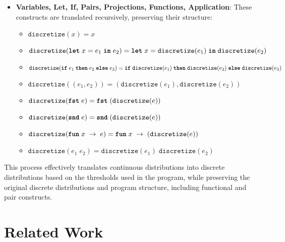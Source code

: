 \documentclass[nonacm,anonymous]{acmart}
\newcommand{\letkw}{\text{\ttfamily\bfseries let}}
\newcommand{\inkw}{\text{\ttfamily\bfseries in}}
\newcommand{\ifkw}{\text{\ttfamily\bfseries if}}
\newcommand{\thenkw}{\text{\ttfamily\bfseries then}}
\newcommand{\elsekw}{\text{\ttfamily\bfseries else}}
\newcommand{\fstkw}{\text{\ttfamily\bfseries fst}}
\newcommand{\sndkw}{\text{\ttfamily\bfseries snd}}
\newcommand{\funkw}{\text{\ttfamily\bfseries fun}}
\begin{document}
\begin{itemize}
    \item \textbf{Variables, Let, If, Pairs, Projections, Functions, Application}: These constructs are translated recursively, preserving their structure:
    \begin{itemize}
        \item $\texttt{discretize}(x) = x$
        \item $\texttt{discretize}(\letkw \; x = e_1 \; \inkw \; e_2) = \letkw \; x = \texttt{discretize}(e_1) \; \inkw \; \texttt{discretize}(e_2)$
        \item $\texttt{discretize}(\ifkw \; e_1 \; \thenkw \; e_2 \; \elsekw \; e_3) = \ifkw \; \texttt{discretize}(e_1) \; \thenkw \; \texttt{discretize}(e_2) \; \elsekw \; \texttt{discretize}(e_3)$
        \item $\texttt{discretize}((e_1, e_2)) = (\texttt{discretize}(e_1), \texttt{discretize}(e_2))$
        \item $\texttt{discretize}(\fstkw \; e) = \fstkw \; (\texttt{discretize}(e))$
        \item $\texttt{discretize}(\sndkw \; e) = \sndkw \; (\texttt{discretize}(e))$
        \item $\texttt{discretize}(\funkw \; x \; \rightarrow \; e) = \funkw \; x \; \rightarrow \; (\texttt{discretize}(e))$
        \item $\texttt{discretize}(e_1 \; e_2) = \texttt{discretize}(e_1) \; \texttt{discretize}(e_2)$
    \end{itemize}
\end{itemize}

This process effectively translates continuous distributions into discrete distributions based on the thresholds used in the program, while preserving the original discrete distributions and program structure, including functional and pair constructs.

\section{Related Work}
\label{sec:related}
\end{document}
